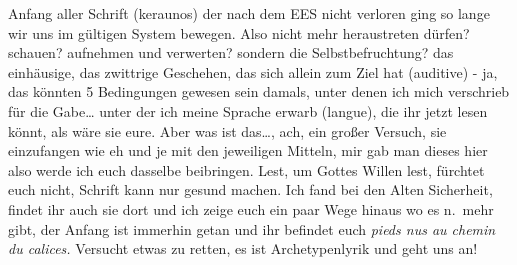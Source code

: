 \documentclass[
]{article}
\begin{document}
Anfang aller Schrift (keraunos) der nach dem EES nicht verloren ging so
lange wir uns im gültigen System bewegen. Also nicht mehr heraustreten
dürfen? schauen? aufnehmen und verwerten? sondern die Selbstbefruchtung?
das einhäusige, das zwittrige Geschehen, das sich allein zum Ziel hat
(auditive) - ja, das könnten 5 Bedingungen gewesen sein damals, unter
denen ich mich verschrieb für die Gabe\ldots{} unter der ich meine
Sprache erwarb (langue), die ihr jetzt lesen könnt, als wäre sie eure.
Aber was ist das\ldots, ach, ein großer Versuch, sie einzufangen wie eh
und je mit den jeweiligen Mitteln, mir gab man dieses hier also werde
ich euch dasselbe beibringen. Lest, um Gottes Willen lest, fürchtet euch
nicht, Schrift kann nur gesund machen. Ich fand bei den Alten
Sicherheit, findet ihr auch sie dort und ich zeige euch ein paar Wege
hinaus wo es n.~mehr gibt, der Anfang ist immerhin getan und ihr
befindet euch \emph{pieds nus au chemin du calices. }Versucht etwas zu
retten, es ist Archetypenlyrik und geht uns an!
\end{document}
